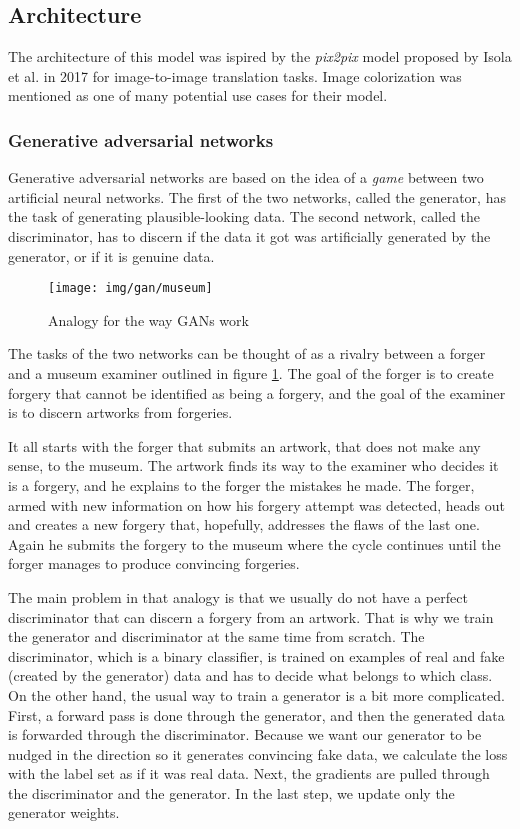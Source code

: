 \subsection{Architecture}

The architecture of this model was ispired by the \textit{pix2pix} model proposed
by Isola et al. in 2017 for image-to-image translation tasks. Image colorization
was mentioned as one of many potential use cases for their model.

\subsubsection{Generative adversarial networks}

Generative adversarial networks are based on the idea of a \textit{game} between
two artificial neural networks. The first of the two networks, called the generator, 
has the task of generating plausible-looking data. The second network, called the
discriminator, has to discern if the data it got was artificially generated by the
generator, or if it is genuine data.

\begin{figure}[!ht]
	\centering
	\texttt{[image: img/gan/museum]}
    \caption{Analogy for the way GANs work}
	\label{fig:museum}
\end{figure}

The tasks of the two networks can be thought of as a rivalry between a forger
and a museum examiner outlined in figure \ref{fig:museum}. The goal of the forger
is to create forgery that cannot be identified as being a forgery, and the goal 
of the examiner is to discern artworks from forgeries.

It all starts with the forger that submits an artwork, that does not make any 
sense, to the museum. The artwork finds its way to the examiner who decides 
it is a forgery, and he explains to the forger the mistakes he made.
The forger, armed with new information on how his forgery attempt was detected, 
heads out and creates a new forgery that, hopefully, addresses the flaws of the
last one. Again he submits the forgery to the museum where the cycle continues
until the forger manages to produce convincing forgeries.

The main problem in that analogy is that we usually do not have a perfect 
discriminator that can discern a forgery from an artwork. That is why 
we train the generator and discriminator at the same time from scratch. The 
discriminator, which is a binary classifier, is trained on examples of real 
and fake (created by the generator) data and has to decide what belongs 
to which class. On the other hand, the usual way to train a generator is a bit
more complicated. First, a forward pass is done through the generator, and then 
the generated data is forwarded through the discriminator. Because we want our 
generator to be nudged in the direction so it generates convincing fake data, we
calculate the loss with the label set as if it was real data. Next, the gradients are
pulled through the discriminator and the generator. In the last step, we update
only the generator weights.

